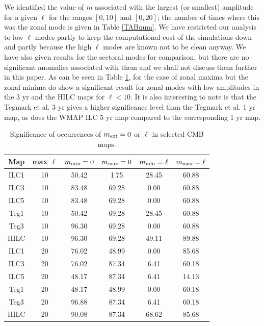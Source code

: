 \documentclass[useAMS,usenatbib,usegraphicx]{mn2e}
\def\l{{\ell}}
\begin{document}
We identified the value of $m$ associated with the largest (or
smallest) amplitude for a given $\l$ for the ranges $[0,10]$ and
$[0,20]$; the number of times where this was the zonal mode is given
in Table \ref{TABnum}. We have restricted our analysis to low $\l$ modes partly to
keep the computational cost of the simulations down and partly
because the high $\l$ modes are known not to be clean anyway. We have also given results for the sectoral
modes for comparison, but there are no significant anomalies
associated with them and we shall not discuss them further in this
paper.  As can be seen in Table \ref{TABsig}, for the case of zonal maxima but the
zonal minima do show a significant result for zonal modes with low
amplitudes in the \cite{b4} 3 yr and the \cite{b5} HILC maps for
$\l<10$. It is also interesting to note is that the Tegmark et al. 3
yr gives a higher significance level than the Tegmark et al. 1 yr
map, as does the WMAP ILC 5 yr map compared to the corresponding 1
yr map.
\begin{table}
  \begin{tabular}{|c|c|c||c|c|c|}
    \hline \hline
    Map & max $\l$ & $m_{\rm min}=0$ & $m_{\rm max}=0$ & $m_{\rm min}=\l$ & $m_{\rm max}=\l$ \\ \hline
    ILC1&   10&      50.42 &    1.75  &             28.45 &             60.88\\
    ILC3&   10&       83.48 &   69.28 &              0.00 &             60.88\\
    ILC5&   10&       83.48 &   69.28 &              0.00 &             60.88\\
    Teg1&   10&  50.42 &    69.28 &             28.45 &             60.88\\
    Teg3&   10&       96.30 &   69.28 &              0.00 &             60.88\\
    HILC&   10&       96.30 &   69.28 &             49.11 &             89.88\\ \hline
    ILC1&   20&  76.02 &    48.99 &              0.00 &             85.68\\
    ILC3&   20&  76.02 &    87.34 &              6.41 &             60.18\\
    ILC5&   20&       48.17 &   87.34 &              6.41 &             14.13\\
    Teg1&   20&  48.17 &    48.99 &              0.00 &             60.18\\
    Teg3&   20&  96.88 &        87.34 &              6.41 &             60.18\\
    HILC&   20&  90.08 &    87.34 &             68.62 &                 85.68\\ \hline
    \hline
  \end{tabular}
  \caption{Significance of occurrences of $m_{\rm ext} = 0$ or $\l$ in selected CMB maps.}
  \label{TABsig}
\end{table}
\end{document}
